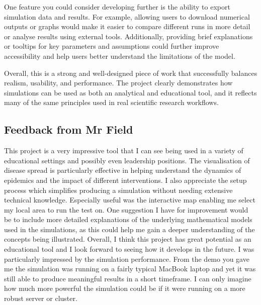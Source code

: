 One feature you could consider developing further is the ability to export simulation data and results. For example, allowing users to download numerical outputs or graphs would make it easier to compare different runs in more detail or analyse results using external tools. Additionally, providing brief explanations or tooltips for key parameters and assumptions could further improve accessibility and help users better understand the limitations of the model.

Overall, this is a strong and well-designed piece of work that successfully balances realism, usability, and performance. The project clearly demonstrates how simulations can be used as both an analytical and educational tool, and it reflects many of the same principles used in real scientific research workflows.


\subsection*{Feedback from Mr Field}
This project is a very impressive tool that I can see being used in a variety of educational settings and possibly even leadership positions. The visualisation of disease spread is particularly effective in helping understand the dynamics of epidemics and the impact of different interventions. I also appreciate the setup process which simplifies producing a simulation without needing extensive technical knowledge. Especially useful was the interactive map enabling me select my local area to run the test on. One suggestion I have for improvement would be to include more detailed explanations of the underlying mathematical models used in the simulations, as this could help me gain a deeper understanding of the concepts being illustrated. Overall, I think this project has great potential as an educational tool and I look forward to seeing how it develops in the future. I was particularly impressed by the simulation performance. From the demo you gave me the simulation was running on a fairly typical MacBook laptop and yet it was still able to produce meaningful results in a short timeframe. I can only imagine how much more powerful the simulation could be if it were running on a more robust server or cluster.

